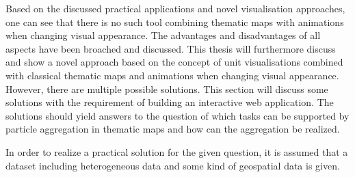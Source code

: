 Based on the discussed practical applications and novel visualisation approaches, one can see that there is no such tool combining thematic maps with animations when changing visual appearance. The advantages and disadvantages of all aspects have been broached and discussed. This thesis will furthermore discuss and show a novel approach based on the concept of unit visualisations combined with classical thematic maps and animations when changing visual appearance. However, there are multiple possible solutions. This section will discuss some solutions with the requirement of building an interactive web application. The solutions should yield answers to the question of which tasks can be supported by particle aggregation in thematic maps and how can the aggregation be realized.

In order to realize a practical solution for the given question, it is assumed that a dataset including heterogeneous data and some kind of geospatial data is given.

